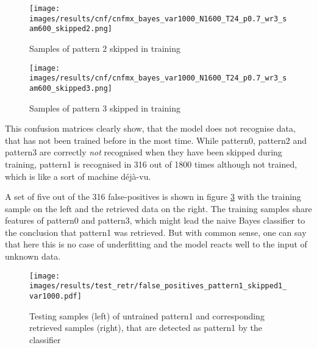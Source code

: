 \begin{figure}[H]
    \centering
    \texttt{[image: images/results/cnf/cnfmx\_bayes\_var1000\_N1600\_T24\_p0.7\_wr3\_sam600\_skipped2.png]}
    \caption{Samples of pattern 2 skipped in training}
    \label{fig:skip_pat2}
\end{figure}

\begin{figure}[H]
    \centering
    \texttt{[image: images/results/cnf/cnfmx\_bayes\_var1000\_N1600\_T24\_p0.7\_wr3\_sam600\_skipped3.png]}
    \caption{Samples of pattern 3 skipped in training}
    \label{fig:skip_pat3}
\end{figure}

This confusion matrices clearly show, that the model does not recognise data, that has not been trained before in the most time.
While pattern0, pattern2 and pattern3 are correctly \textit{not} recognised when they have been skipped during training,
pattern1 is recognised in 316 out of 1800 times although not trained,
which is like a sort of machine déjà-vu.

A set of five out of the 316 false-positives is shown in figure \ref{fig:false_positives} with the training sample on the left and the retrieved data on the right.
The training samples share features of pattern0 and pattern3, which might lead the naive Bayes classifier to the conclusion that pattern1 was retrieved.
But with common sense, one can say that here this is no case of underfitting and the model reacts well to the input of unknown data.

\begin{figure}[H]
    \centering
    \texttt{[image: images/results/test\_retr/false\_positives\_pattern1\_skipped1\_var1000.pdf]}
    \caption{Testing samples (left) of untrained pattern1 and corresponding retrieved samples (right), that are detected as pattern1 by the classifier}
    \label{fig:false_positives}
\end{figure}
